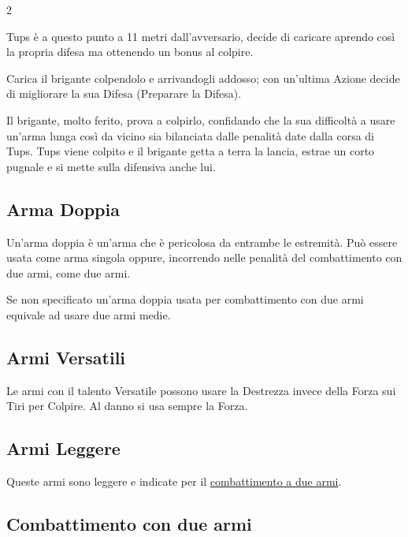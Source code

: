 \begin{multicols}{2}
\begin{giocatore}
		Tups è a questo punto a 11 metri dall'avversario, decide di caricare aprendo così la propria difesa ma ottenendo un bonus al colpire.

		Carica il brigante colpendolo e arrivandogli addosso; con un'ultima Azione decide di migliorare la sua Difesa (Preparare la Difesa).

		Il brigante, molto ferito, prova a colpirlo, confidando che la sua difficoltà a usare un'arma lunga così da vicino sia bilanciata dalle penalità date dalla corsa di Tups. Tups viene colpito e il brigante getta a terra la lancia, estrae un corto pugnale e si mette sulla difensiva anche lui.

\end{giocatore}

\subsection{Arma Doppia} \label{armadippia}

Un'arma doppia è un'arma che è pericolosa da entrambe le estremità. Può essere usata come arma singola oppure, incorrendo nelle penalità del combattimento con due armi, come due armi.

Se non specificato un'arma doppia usata per combattimento con due armi equivale ad usare due armi medie.

\subsection{Armi Versatili} \label{armiversatili}

Le armi con il talento Versatile possono usare la Destrezza invece della Forza sui Tiri per Colpire. Al danno si usa sempre la Forza.

\subsection{Armi Leggere} \label{armileggere}

Queste armi sono leggere e indicate per il \hyperlink{combattimentoaduemani}{combattimento a due armi}.



\subsection{Combattimento con due armi}\hypertarget{combattimentoaduemani}{}\label{combattimentoduemani}


\end{multicols}
